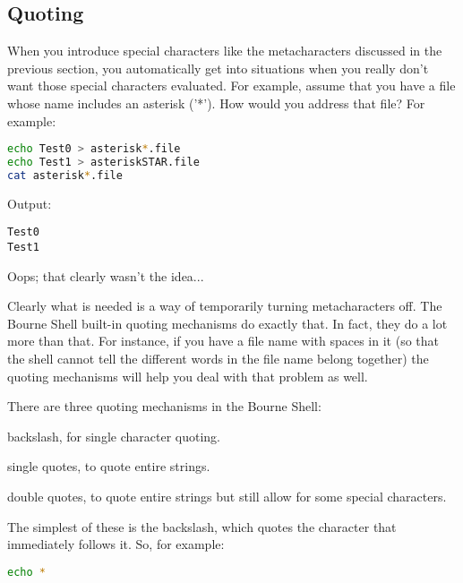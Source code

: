 \subsection{Quoting}
When you introduce special characters like the metacharacters discussed in the
previous section, you automatically get into situations when you really don't
want those special characters evaluated. For example, assume that you have a
file whose name includes an asterisk ('*'). How would you address that file?
For example:
\lstset{basicstyle=\scriptsize, numbers=left, captionpos=b, tabsize=4}
\begin{lstlisting}[caption=Metacharacters in file names can cause problems,language={bash},
breaklines=true,xleftmargin=15pt,label=lst:Metacharacters in file names can cause problems]
echo Test0 > asterisk*.file
echo Test1 > asteriskSTAR.file
cat asterisk*.file
\end{lstlisting}

Output:
\scriptsize
\begin{verbatim}
Test0
Test1
\end{verbatim}
\normalsize
Oops; that clearly wasn't the idea...

Clearly what is needed is a way of temporarily turning metacharacters off. The
Bourne Shell built-in quoting mechanisms do exactly that. In fact, they do a
lot more than that. For instance, if you have a file name with spaces in it (so
that the shell cannot tell the different words in the file name belong
together) the quoting mechanisms will help you deal with that problem as well.

There are three quoting mechanisms in the Bourne Shell:

\begin{description}
\setlength{\leftmargin}{0pt}
\setlength{\itemsep}{0pt}
\setlength{\parsep}{0pt}
\setlength{\parskip}{0pt}
	\item[\textbackslash{}] backslash, for single character quoting.
	\item[''] single quotes, to quote entire strings.
	\item[``''] double quotes, to quote entire strings but still allow for some special characters.
\end{description}

The simplest of these is the backslash, which quotes the character that
immediately follows it. So, for example:

\lstset{basicstyle=\scriptsize, numbers=left, captionpos=b, tabsize=4}
\begin{lstlisting}[caption=Echo with an asterisk,language={bash},
breaklines=true,xleftmargin=15pt,label=lst:Echo with an asterisk]
echo *
\end{lstlisting}

